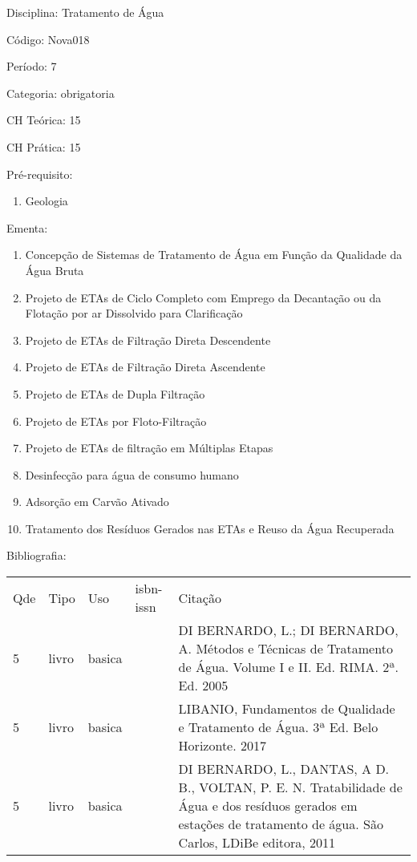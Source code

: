 \documentclass[12pt,a4paper,twoside]{report}
\begin{document}
Disciplina: Tratamento de Água

Código: Nova018

Período: 7

Categoria: obrigatoria

CH Teórica: 15

CH Prática: 15




Pré-requisito:
\begin{enumerate}
\item Geologia
\end{enumerate}

Ementa:
\begin{enumerate}
\item Concepção de Sistemas de Tratamento de Água em Função da Qualidade da Água Bruta
\item Projeto de ETAs de Ciclo Completo com Emprego da Decantação ou da Flotação por ar Dissolvido para Clarificação
\item Projeto de ETAs de Filtração Direta Descendente
\item Projeto de ETAs de Filtração Direta Ascendente
\item Projeto de ETAs de Dupla Filtração
\item Projeto de ETAs por Floto-Filtração
\item Projeto de ETAs de filtração em Múltiplas Etapas
\item Desinfecção para água de consumo humano
\item Adsorção em Carvão Ativado
\item Tratamento dos Resíduos Gerados nas ETAs e Reuso da Água Recuperada
\end{enumerate}



Bibliografia:


\begin{tabular}{llllp{8cm}}
Qde & Tipo & Uso & isbn-issn & Citação \\
5&livro&basica&&DI BERNARDO, L.; DI BERNARDO, A. Métodos e Técnicas de Tratamento de Água. Volume I e II. Ed. RIMA. 2ª. Ed. 2005\\
5&livro&basica&&LIBANIO, Fundamentos de Qualidade e Tratamento de Água. 3ª Ed. Belo Horizonte. 2017\\
5&livro&basica&&DI BERNARDO, L., DANTAS, A D. B., VOLTAN, P. E. N. Tratabilidade de Água e dos resíduos gerados em estações de tratamento de água. São Carlos, LDiBe editora, 2011\\
\end{tabular}
\end{document}
